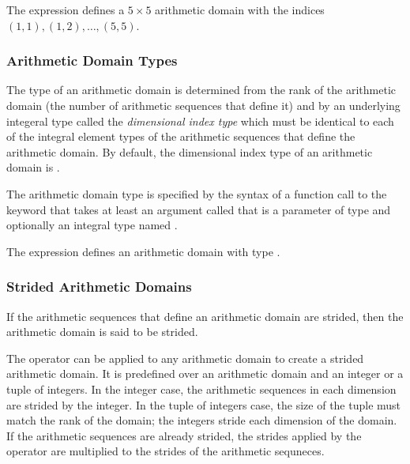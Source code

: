 \begin{example}
The expression \chpl{[1..5, 1..5]} defines a $5 \times 5$ arithmetic
domain with the indices $(1, 1), (1, 2), \ldots, (5, 5)$.
\end{example}

\subsubsection{Arithmetic Domain Types}
\label{Arithmetic_Domain_Types}

The type of an arithmetic domain is determined from the rank of the
arithmetic domain (the number of arithmetic sequences that define it)
and by an underlying integeral type called the {\em dimensional index
type} which must be identical to each of the integral element types of
the arithmetic sequences that define the arithmetic domain.  By
default, the dimensional index type of an arithmetic domain
is .

The arithmetic domain type is specified by the syntax of a function
call to the keyword  that takes at least an argument
called  that is a parameter of type  and
optionally an integral type named .

\begin{example}
The expression \chpl{[1..5, 1..5]} defines an arithmetic domain with
type .
\end{example}

\subsubsection{Strided Arithmetic Domains}
\label{Strided_Arithmetic_Domains_and_Arrays}

If the arithmetic sequences that define an arithmetic domain are
strided, then the arithmetic domain is said to be strided.

The  operator can be applied to any arithmetic domain to
create a strided arithmetic domain.  It is predefined over an
arithmetic domain and an integer or a tuple of integers.  In the
integer case, the arithmetic sequences in each dimension are strided
by the integer.  In the tuple of integers case, the size of the tuple
must match the rank of the domain; the integers stride each dimension
of the domain.  If the arithmetic sequences are already strided, the
strides applied by the  operator are multiplied to the
strides of the arithmetic sequneces.

